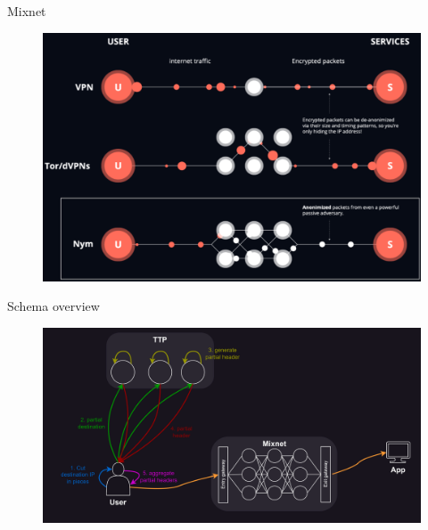 \begin{frame}{Mixnet}
    \centering
    \begin{figure}
        \includegraphics[width=0.8\linewidth]{Images/mixnet.png}
    \end{figure} 
\end{frame}

\begin{frame}{Schema overview}
    \centering
    \begin{figure}
        \includegraphics[width=\linewidth]{Images/sphinx_ttp.png}
    \end{figure}
\end{frame}

